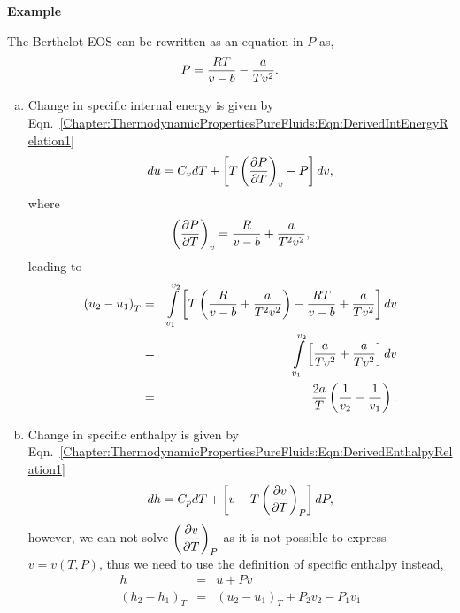 \begin{MyExample}{\begin{center}{\bf Example}\end{center}}
        The Berthelot EOS can be rewritten as an equation in $P$ as,
           \begin{displaymath}
              P = \frc{RT}{v-b} - \frc{a}{Tv^{2}}.
           \end{displaymath}
         \begin{enumerate}[a)]
            \item Change in specific internal energy is given by Eqn.~\ref{Chapter:ThermodynamicPropertiesPureFluids:Eqn:DerivedIntEnergyRelation1}
                \begin{displaymath}
                     du = C_{v}dT + \left[T\Partial[P]{T}{v}-P\right]dv,
                \end{displaymath}
                where
                \begin{displaymath}
                     \Partial[P]{T}{v} = \frc{R}{v-b} + \frc{a}{T^{2}v^{2}},
                \end{displaymath}
                leading to
                \begin{eqnarray}
                    \left(u_{2}-u_{1}\right)_{T} &=& \int\limits_{v_{1}}^{v_{2}}\left[T \left(\frc{R}{v-b} + \frc{a}{T^{2}v^{2}}\right) - \frc{RT}{v-b} + \frc{a}{Tv^{2}}\right] dv \nonumber \\
                                               &=& \int\limits_{v_{1}}^{v_{2}}\left[\frc{a}{Tv^{2}} + \frc{a}{Tv^{2}}\right] dv \nonumber \\
                                               &=& \frc{2a}{T}\left(\frc{1}{v_{2}}-\frc{1}{v_{1}}\right). \nonumber
                \end{eqnarray}
            \item Change in specific enthalpy is given by Eqn.~\ref{Chapter:ThermodynamicPropertiesPureFluids:Eqn:DerivedEnthalpyRelation1}
                \begin{displaymath}
                     dh = C_{p}dT + \left[v - T\Partial[v]{T}{P}\right]dP,
                \end{displaymath}
                however, we can not solve $\Partial[v]{T}{P}$ as it is not possible to express $v=v(T,P)$, thus we need to use the definition of specific enthalpy instead,
                \begin{eqnarray}
                                          h &=& u + Pv \nonumber \\
                 \left(h_{2}-h_{1}\right)_{T} &=& \left(u_{2}-u_{1}\right)_{T} + P_{2}v_{2} - P_{1}v_{1} \nonumber \\

\end{eqnarray}
\end{enumerate}
\end{MyExample}
